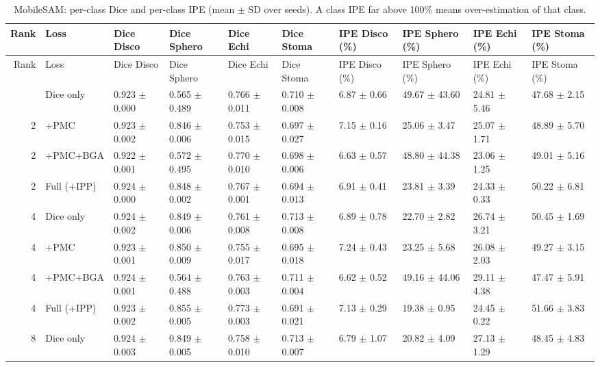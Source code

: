 \documentclass[10pt]{article}
\begin{document}
\begin{landscape}
{}
{\scriptsize
\begin{longtable}{r l l l l l l l l l}
\caption{MobileSAM: per-class Dice and per-class IPE (mean $\pm$ SD over seeds). A class IPE far above 100\% means over-estimation of that class.}\label{tab:cls_mobile_sam}\\
\toprule
Rank & Loss & Dice Disco & Dice Sphero & Dice Echi & Dice Stoma & IPE Disco (\%) & IPE Sphero (\%) & IPE Echi (\%) & IPE Stoma (\%) \\
\midrule
\endfirsthead
\toprule
Rank & Loss & Dice Disco & Dice Sphero & Dice Echi & Dice Stoma & IPE Disco (\%) & IPE Sphero (\%) & IPE Echi (\%) & IPE Stoma (\%) \\
\midrule
\endhead
\bottomrule
\endfoot
2 & Dice only & 0.923 $\pm$ 0.000 & 0.565 $\pm$ 0.489 & 0.766 $\pm$ 0.011 & 0.710 $\pm$ 0.008 & 6.87 $\pm$ 0.66 & 49.67 $\pm$ 43.60 & 24.81 $\pm$ 5.46 & 47.68 $\pm$ 2.15 \\
2 & +PMC & 0.923 $\pm$ 0.002 & 0.846 $\pm$ 0.006 & 0.753 $\pm$ 0.015 & 0.697 $\pm$ 0.027 & 7.15 $\pm$ 0.16 & 25.06 $\pm$ 3.47 & 25.07 $\pm$ 1.71 & 48.89 $\pm$ 5.70 \\
2 & +PMC+BGA & 0.922 $\pm$ 0.001 & 0.572 $\pm$ 0.495 & 0.770 $\pm$ 0.010 & 0.698 $\pm$ 0.006 & 6.63 $\pm$ 0.57 & 48.80 $\pm$ 44.38 & 23.06 $\pm$ 1.25 & 49.01 $\pm$ 5.16 \\
2 & Full (+IPP) & 0.924 $\pm$ 0.000 & 0.848 $\pm$ 0.002 & 0.767 $\pm$ 0.001 & 0.694 $\pm$ 0.013 & 6.91 $\pm$ 0.41 & 23.81 $\pm$ 3.39 & 24.33 $\pm$ 0.33 & 50.22 $\pm$ 6.81 \\
4 & Dice only & 0.924 $\pm$ 0.002 & 0.849 $\pm$ 0.006 & 0.761 $\pm$ 0.008 & 0.713 $\pm$ 0.008 & 6.89 $\pm$ 0.78 & 22.70 $\pm$ 2.82 & 26.74 $\pm$ 3.21 & 50.45 $\pm$ 1.69 \\
4 & +PMC & 0.923 $\pm$ 0.001 & 0.850 $\pm$ 0.009 & 0.755 $\pm$ 0.017 & 0.695 $\pm$ 0.018 & 7.24 $\pm$ 0.43 & 23.25 $\pm$ 5.68 & 26.08 $\pm$ 2.03 & 49.27 $\pm$ 3.15 \\
4 & +PMC+BGA & 0.924 $\pm$ 0.001 & 0.564 $\pm$ 0.488 & 0.763 $\pm$ 0.003 & 0.711 $\pm$ 0.004 & 6.62 $\pm$ 0.52 & 49.16 $\pm$ 44.06 & 29.11 $\pm$ 4.38 & 47.47 $\pm$ 5.91 \\
4 & Full (+IPP) & 0.923 $\pm$ 0.002 & 0.855 $\pm$ 0.005 & 0.773 $\pm$ 0.003 & 0.691 $\pm$ 0.021 & 7.13 $\pm$ 0.29 & 19.38 $\pm$ 0.95 & 24.45 $\pm$ 0.22 & 51.66 $\pm$ 3.83 \\
8 & Dice only & 0.924 $\pm$ 0.003 & 0.849 $\pm$ 0.005 & 0.758 $\pm$ 0.010 & 0.713 $\pm$ 0.007 & 6.79 $\pm$ 1.07 & 20.82 $\pm$ 4.09 & 27.13 $\pm$ 1.29 & 48.45 $\pm$ 4.83 \\

\end{longtable}}
\end{landscape}
\end{document}
